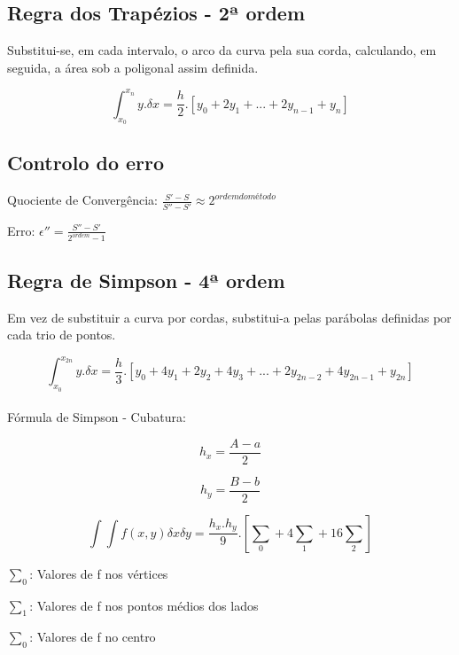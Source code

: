 \documentclass[../resumosMNUM.tex]{subfiles}
\begin{document}
 

\subsection{Regra dos Trapézios - 2ª ordem}

Substitui-se, em cada intervalo, o arco da curva pela sua corda, calculando, em seguida, a área sob a poligonal assim definida.

\[ \int_{x_0}^{x_n} y.\delta x = \frac{h}{2} . [y_0 + 2y_1 + ... + 2y_{n-1} + y_n]\]

\subsection{Controlo do erro}

Quociente de Convergência: \(\frac{S' - S}{S'' - S'} \approx 2^{ordem do método}\)

Erro: \(\epsilon '' = \frac{S'' - S'}{2^{ordem} - 1}\)

\subsection{Regra de Simpson - 4ª ordem}

Em vez de substituir a curva por cordas, substitui-a pelas parábolas definidas por cada trio de pontos.

\[ \int_{x_0}^{x_{2n}} y.\delta x = \frac{h}{3} . [y_0 + 4y_1 + 2y_2 + 4y_3 + ... + 2y_{2n-2} + 4y_{2n-1} + y_{2n}]\]

\paragraph{}

Fórmula de Simpson - Cubatura:

\[h_x = \frac{A - a}{2}\]

\[h_y = \frac{B - b}{2}\]

\[ \int \int f(x, y) \delta x \delta y = \frac{h_x . h_y}{9} . [\sum_0 + 4\sum_1 + 16\sum_2]\]

$\sum_0$: Valores de f nos vértices 

$\sum_1$: Valores de f nos pontos médios dos lados 

$\sum_0$: Valores de f no centro
\end{document}

